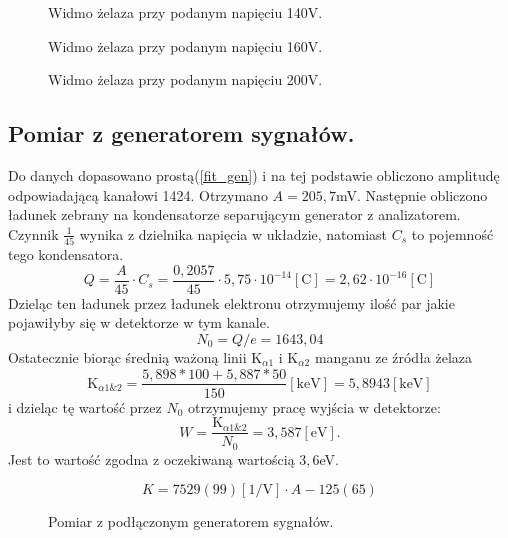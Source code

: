 \documentclass[11pt,a4paper]{article}
\begin{document}
\begin{figure}[H]
\centering
\resizebox{.8\linewidth}{!}{}
\caption{Widmo żelaza przy podanym napięciu 140V.}
\label{fig1}
\end{figure}

\begin{figure}[H]
\centering
\resizebox{.8\linewidth}{!}{}
\caption{Widmo żelaza przy podanym napięciu 160V.}
\label{fig1}
\end{figure}

\begin{figure}[H]
\centering
\resizebox{.8\linewidth}{!}{}
\caption{Widmo żelaza przy podanym napięciu 200V.}
\label{fig1}
\end{figure}

\subsection{Pomiar z generatorem sygnałów.}
Do danych dopasowano prostą(\ref{fit_gen}) i na tej podstawie obliczono amplitudę odpowiadającą kanałowi 1424. 
Otrzymano $A = 205,7$mV.
Następnie obliczono ładunek zebrany na kondensatorze separującym generator z analizatorem. 
Czynnik $\frac{1}{45}$ wynika z dzielnika napięcia w układzie, natomiast $C_s$ to pojemność tego kondensatora.
$$
Q=\frac{A}{45} \cdot C_s = \frac{0,2057}{45}\cdot 5,75\cdot 10^{-14} [\text{C}] = 2,62\cdot 10^{-16} [\text{C}]
$$
Dzieląc ten ładunek przez ładunek elektronu otrzymujemy ilość par jakie pojawiłyby się w detektorze w tym kanale.
$$
N_0 = Q/e = 1643,04
$$
Ostatecznie biorąc średnią ważoną linii K$_{\alpha 1}$ i K$_{\alpha 2}$ manganu ze źródła żelaza
$$
\text{K}_{\alpha 1\&2} = \frac{5,898*100 + 5,887*50}{150} [\text{keV}]=5,8943 [\text{keV}]
$$
i dzieląc tę wartość przez $N_0$ otrzymujemy pracę wyjścia w detektorze:
\begin{equation}
	W = \frac{\text{K}_{\alpha 1\&2}}{N_0} = 3,587 [\text{eV}].
\end{equation}
Jest to wartość zgodna z oczekiwaną wartością $3,6$eV.

\begin{equation}
	K = 7529(99)[\text{1/V}] \cdot A -125(65)
	\label{fit_gen}
\end{equation}
\begin{figure}[H]
\centering
\resizebox{.8\linewidth}{!}{}
\caption{Pomiar z podłączonym generatorem sygnałów.}
\label{fig1}
\end{figure}
\end{document}
